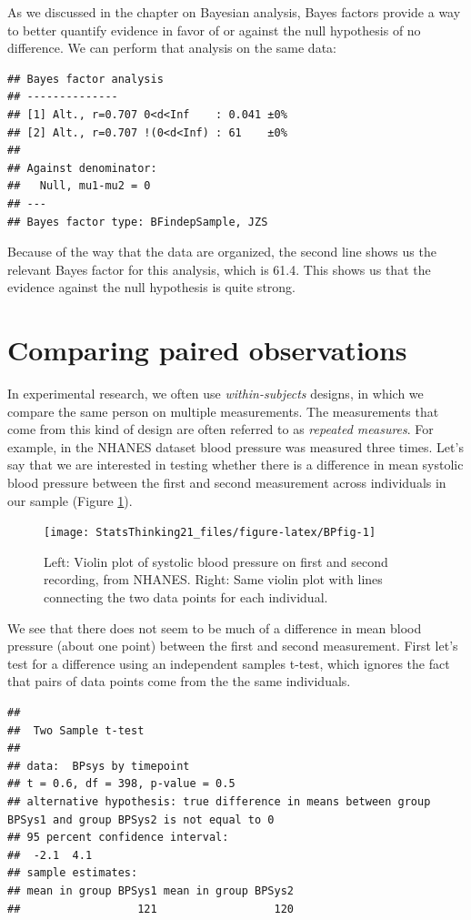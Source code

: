 \documentclass[
  12pt,
]{book}
\begin{document}
As we discussed in the chapter on Bayesian analysis, Bayes factors provide a way to better quantify evidence in favor of or against the null hypothesis of no difference. We can perform that analysis on the same data:

\begin{verbatim}
## Bayes factor analysis
## --------------
## [1] Alt., r=0.707 0<d<Inf    : 0.041 ±0%
## [2] Alt., r=0.707 !(0<d<Inf) : 61    ±0%
## 
## Against denominator:
##   Null, mu1-mu2 = 0 
## ---
## Bayes factor type: BFindepSample, JZS
\end{verbatim}

Because of the way that the data are organized, the second line shows us the relevant Bayes factor for this analysis, which is 61.4. This shows us that the evidence against the null hypothesis is quite strong.

\hypertarget{paired-ttests}{%
\section{Comparing paired observations}\label{paired-ttests}}

In experimental research, we often use \emph{within-subjects} designs, in which we compare the same person on multiple measurements. The measurements that come from this kind of design are often referred to as \emph{repeated measures}. For example, in the NHANES dataset blood pressure was measured three times. Let's say that we are interested in testing whether there is a difference in mean systolic blood pressure between the first and second measurement across individuals in our sample (Figure \ref{fig:BPfig}).

\begin{figure}
\texttt{[image: StatsThinking21\_files/figure-latex/BPfig-1]} \caption{Left: Violin plot of systolic blood pressure on first and second recording, from NHANES. Right: Same violin plot with lines connecting the two data points for each individual.}\label{fig:BPfig}
\end{figure}

We see that there does not seem to be much of a difference in mean blood pressure (about one point) between the first and second measurement. First let's test for a difference using an independent samples t-test, which ignores the fact that pairs of data points come from the the same individuals.

\begin{verbatim}
## 
##  Two Sample t-test
## 
## data:  BPsys by timepoint
## t = 0.6, df = 398, p-value = 0.5
## alternative hypothesis: true difference in means between group BPSys1 and group BPSys2 is not equal to 0
## 95 percent confidence interval:
##  -2.1  4.1
## sample estimates:
## mean in group BPSys1 mean in group BPSys2 
##                  121                  120
\end{verbatim}
\end{document}

